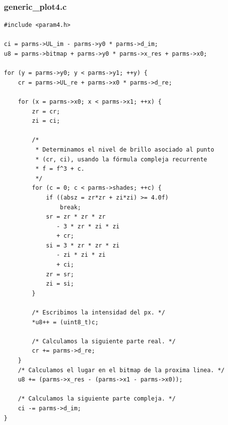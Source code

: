 \documentclass[a4paper,10pt]{article}
\begin{document}
\subsubsection{generic\_plot4.c}
\begin{verbatim}
#include <param4.h>

ci = parms->UL_im - parms->y0 * parms->d_im;
u8 = parms->bitmap + parms->y0 * parms->x_res + parms->x0;

for (y = parms->y0; y < parms->y1; ++y) {
	cr = parms->UL_re + parms->x0 * parms->d_re;

	for (x = parms->x0; x < parms->x1; ++x) {
		zr = cr;
		zi = ci;

		/*
		 * Determinamos el nivel de brillo asociado al punto
		 * (cr, ci), usando la fórmula compleja recurrente 
		 * f = f^3 + c.
		 */
		for (c = 0; c < parms->shades; ++c) {
			if ((absz = zr*zr + zi*zi) >= 4.0f)
				break;
			sr = zr * zr * zr
			   - 3 * zr * zi * zi
			   + cr;
			si = 3 * zr * zr * zi
			   - zi * zi * zi
			   + ci;
			zr = sr;
			zi = si;
		}

		/* Escribimos la intensidad del px. */
		*u8++ = (uint8_t)c;

		/* Calculamos la siguiente parte real. */
		cr += parms->d_re;
	}
	/* Calculamos el lugar en el bitmap de la proxima linea. */
	u8 += (parms->x_res - (parms->x1 - parms->x0));

	/* Calculamos la siguiente parte compleja. */
	ci -= parms->d_im;
}

\end{verbatim}
\end{document}
